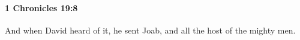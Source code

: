 
		\paragraph{1 Chronicles 19:8} %
			\label{1CHRONICLES-19-8}

			And when David heard of it, he sent Joab, and all the host of the mighty men.


